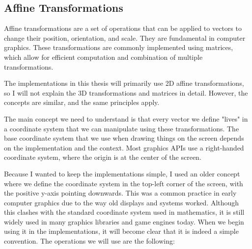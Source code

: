 \subsection{Affine Transformations}
\label{sec:affine-transformations}

Affine transformations are a set of operations that can be applied to vectors to change their position, orientation, and scale. They are fundamental in computer graphics. These transformations are commonly implemented using matrices, which allow for efficient computation and combination of multiple transformations.

The implementations in this thesis will primarily use 2D affine transformations, so I will not explain the 3D transformations and matrices in detail. However, the concepts are similar, and the same principles apply.

The main concept we need to understand is that every vector we define "lives" in a coordinate system that we can manipulate using these transformations. The base coordinate system that we use when drawing things on the screen depends on the implementation and the context. Most graphics APIs use a right-handed coordinate system, where the origin is at the center of the screen.

Because I wanted to keep the implementations simple, I used an older concept where we define the coordinate system in the top-left corner of the screen, with the positive y-axis pointing downwards. This was a common practice in early computer graphics due to the way old displays and systems worked. Although this clashes with the standard coordinate system used in mathematics, it is still widely used in many graphics libraries and game engines today. When we begin using it in the implementations, it will become clear that it is indeed a simple convention. The operations we will use are the following:

